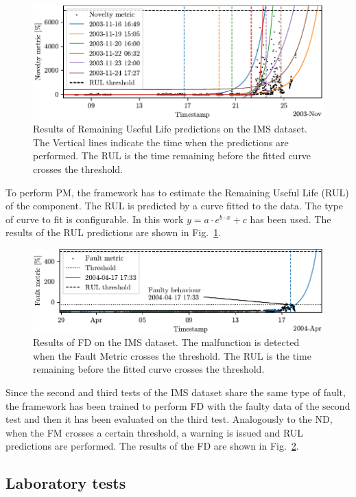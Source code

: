 \documentclass[a4paper, 10pt, conference, oneside]{ieeeconf}
\begin{document}
\begin{figure}
    \includegraphics[width=\linewidth]{images/RUL_IMS.pdf}
    \caption{Results of Remaining Useful Life predictions on the IMS dataset. The Vertical lines indicate the time when the predictions are performed. The RUL is the time remaining before the fitted curve crosses the threshold.}
    \label{fig:RUL_IMS}
\end{figure}
To perform PM, the framework has to estimate the Remaining Useful Life (RUL) of the component. The RUL is predicted by a curve fitted to the data. The type of curve to fit is configurable. In this work $y = a \cdot e^{b \cdot x} + c$ has been used. The results of the RUL predictions are shown in Fig.~\ref{fig:RUL_IMS}.

\begin{figure}
    \includegraphics[width=\linewidth]{images/FD_IMS.pdf}
    \caption{Results of FD on the IMS dataset. The malfunction is detected when the Fault Metric crosses the threshold. The RUL is the time remaining before the fitted curve crosses the threshold.}
    \label{fig:FD_IMS}
\end{figure}
Since the second and third tests of the IMS dataset share the same type of fault, the framework has been trained to perform FD with the faulty data of the second test and then it has been evaluated on the third test. Analogously to the ND, when the FM crosses a certain threshold, a warning is issued and RUL predictions are performed. The results of the FD are shown in Fig.~\ref{fig:FD_IMS}.

\subsection{Laboratory tests}
\end{document}
